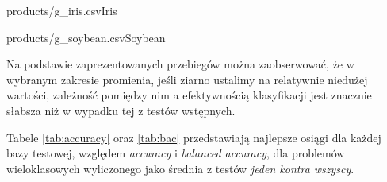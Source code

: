 \documentclass[]{article}
\begin{document}
\begin{table}[!ht]
    \parbox{.45\linewidth}{
	    \begin{rideg}{products/g_iris.csv}{Iris}\end{rideg}
	}
	\hfill
    \parbox{.45\linewidth}{
	    \begin{rideg}{products/g_soybean.csv}{Soybean}\end{rideg}
	}
\end{table}

\FloatBarrier

Na podstawie zaprezentowanych przebiegów można zaobserwować, że w wybranym zakresie promienia, jeśli ziarno ustalimy na relatywnie niedużej wartości, zależność pomiędzy nim a efektywnością klasyfikacji jest znacznie słabsza niż w wypadku tej z testów wstępnych.

Tabele \ref{tab:accuracy} oraz \ref{tab:bac} przedstawiają najlepsze osiągi dla każdej bazy testowej, względem \emph{accuracy} i \emph{balanced accuracy}, dla problemów wieloklasowych wyliczonego jako średnia z testów \emph{jeden kontra wszyscy}. 
\end{document}
